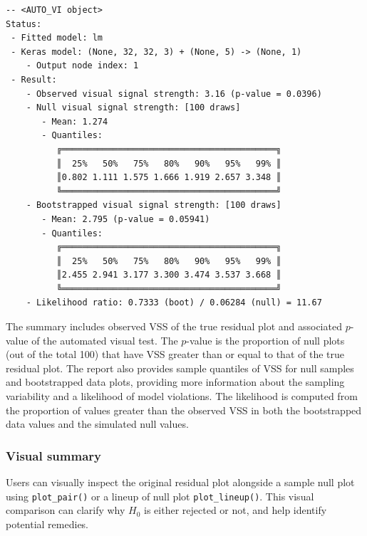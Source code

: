 \documentclass[
doublespace,
  times]{anzsauth}
\newenvironment{Shaded}{\begin{snugshade}}{\end{snugshade}}
\newcommand{\FunctionTok}[1]{\textcolor[rgb]{0.28,0.35,0.67}{#1}}
\newcommand{\NormalTok}[1]{\textcolor[rgb]{0.00,0.23,0.31}{#1}}
\newcommand{\SpecialCharTok}[1]{\textcolor[rgb]{0.37,0.37,0.37}{#1}}
\begin{document}
\begin{verbatim}
-- <AUTO_VI object>
Status:
 - Fitted model: lm
 - Keras model: (None, 32, 32, 3) + (None, 5) -> (None, 1)
    - Output node index: 1
 - Result:
    - Observed visual signal strength: 3.16 (p-value = 0.0396)
    - Null visual signal strength: [100 draws]
       - Mean: 1.274
       - Quantiles: 
          ╔══════════════════════════════════════════╗
          ║  25%   50%   75%   80%   90%   95%   99% ║
          ║0.802 1.111 1.575 1.666 1.919 2.657 3.348 ║
          ╚══════════════════════════════════════════╝
    - Bootstrapped visual signal strength: [100 draws]
       - Mean: 2.795 (p-value = 0.05941)
       - Quantiles: 
          ╔══════════════════════════════════════════╗
          ║  25%   50%   75%   80%   90%   95%   99% ║
          ║2.455 2.941 3.177 3.300 3.474 3.537 3.668 ║
          ╚══════════════════════════════════════════╝
    - Likelihood ratio: 0.7333 (boot) / 0.06284 (null) = 11.67 
\end{verbatim}

The summary includes observed VSS of the true residual plot and
associated \(p\)-value of the automated visual test. The \(p\)-value is
the proportion of null plots (out of the total 100) that have VSS
greater than or equal to that of the true residual plot. The report also
provides sample quantiles of VSS for null samples and bootstrapped data
plots, providing more information about the sampling variability and a
likelihood of model violations. The likelihood is computed from the
proportion of values greater than the observed VSS in both the
bootstrapped data values and the simulated null values.

\subsubsection{Visual summary}\label{sec-autovi-visual}

Users can visually inspect the original residual plot alongside a sample
null plot using \texttt{plot\_pair()} or a lineup of null plot
\texttt{plot\_lineup()}. This visual comparison can clarify why \(H_0\)
is either rejected or not, and help identify potential remedies.

\begin{Shaded}
\end{Shaded}
\end{document}
